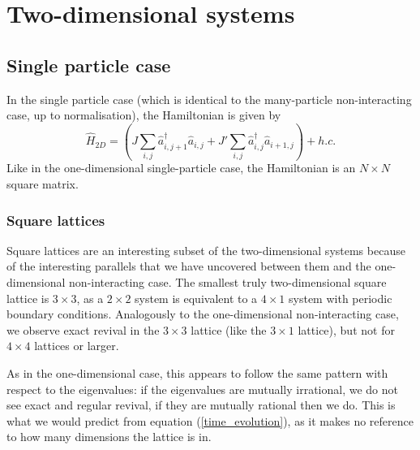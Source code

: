 \documentclass[a4paper, 10pt]{article}
\theoremstyle{plain}
\begin{document}
\section{Two-dimensional systems\label{2Dsystems}}

\subsection{Single particle case}

In the single particle case (which is identical to the many-particle
non-interacting case, up to normalisation), the Hamiltonian is given by
\begin{equation}
    \hat{H}_{2D}
    =
    \left (
        J \sum_{i,j}{\hat{a}^{\dagger}_{i,j+1} \hat{a}_{i,j}} +
        J'\sum_{i,j}{\hat{a}^{\dagger}_{i,j}   \hat{a}_{i+1,j}}
    \right )
    +
    h.c.
\end{equation}
Like in the one-dimensional single-particle case, the Hamiltonian is an
$N \times N$ square matrix.

\subsubsection{Square lattices}

Square lattices are an interesting subset of the two-dimensional systems because
of the interesting parallels that we have uncovered between them and the
one-dimensional non-interacting case. 
The smallest truly two-dimensional square lattice is $3 \times 3$, as a 
$2 \times 2$ system is equivalent to a $4 \times1$ system with periodic 
boundary conditions. Analogously to the one-dimensional non-interacting case, 
we observe exact revival in the $3 \times 3$ lattice (like the $3 \times 1$ 
lattice), but not for $4 \times 4$ lattices or larger.

As in the one-dimensional case, this appears to follow the same pattern with
respect to the eigenvalues: if the eigenvalues are mutually irrational, we do
not see exact and regular revival, if they are mutually rational then we do.
This is what we would predict from equation (\ref{time_evolution}), as it makes
no reference to how many dimensions the lattice is in.
\end{document}
